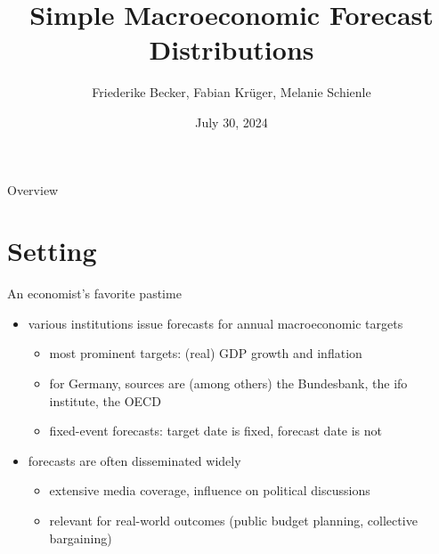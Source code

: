 \documentclass[en]{sdqbeamer}
\title[Simple Prediction Intervals]{Simple Macroeconomic Forecast Distributions}
\subtitle{}
\author[Friederike Becker, Fabian Krüger, Melanie Schienle]{Friederike Becker, Fabian Krüger, Melanie Schienle}
\date[30.\,07.\,2024]{July 30, 2024}
\begin{document}
 
\KITtitleframe

\begin{frame}{Overview}
\tableofcontents
\end{frame}

\section{Setting}


\begin{frame}{An economist's favorite pastime}
	\begin{itemize}
	    \item various institutions issue forecasts for annual macroeconomic targets
     \begin{itemize}
        \item most prominent targets: (real) GDP growth and inflation
        \item for Germany, sources are (among others) the Bundesbank, the ifo institute, the OECD
         \item fixed-event forecasts: target date is fixed, forecast date is not
     \end{itemize}
     \item forecasts are often disseminated widely
     \begin{itemize}
         \item extensive media coverage, influence on political discussions
         \item relevant for real-world outcomes (public budget planning, collective bargaining)
     \end{itemize}
	\end{itemize}
\end{frame}
\end{document}
